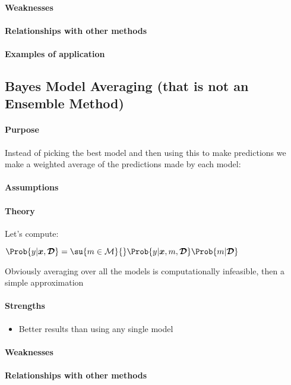 \paragraph{Weaknesses}
\paragraph{Relationships with other methods}
\paragraph{Examples of application}


\subsection{Bayes Model Averaging (that is not an Ensemble Method)}
\paragraph{Purpose}
Instead of picking the best model and then using this to make predictions we make
a weighted average of the predictions made by each model:
\paragraph{Assumptions}
\paragraph{Theory}
Let's compute:
\begin{center}
    $\Prob{y|\bm{x},\bm{\mathcal{D}}} = \su{m\in\mathcal{M}}{}
    \Prob{y|\bm{x}, m, \bm{\mathcal{D}}}\Prob{m|\bm{\mathcal{D}}}$
\end{center}
Obviously averaging over all the models is computationally infeasible, then a simple
approximation 
\paragraph{Strengths}
\begin{itemize}
    \item Better results than using any single model
\end{itemize}

\paragraph{Weaknesses}
\paragraph{Relationships with other methods}
